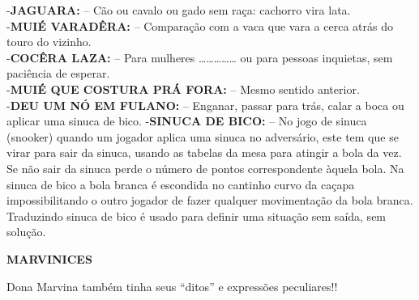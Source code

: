 \documentclass[12pt,brazil,]{book}
\begin{document}
-\textbf{JAGUARA:} -- Cão ou cavalo ou gado sem raça: cachorro vira
lata.\\
-\textbf{MUIÉ VARADÊRA:} -- Comparação com a vaca que vara a cerca atrás
do touro do vizinho.\\
-\textbf{COCÊRA LAZA:} -- Para mulheres
\ldots{}\ldots{}\ldots{}\ldots{}\ldots{} ou para pessoas inquietas, sem
paciência de esperar.\\
-\textbf{MUIÉ QUE COSTURA PRÁ FORA:} -- Mesmo sentido anterior.\\
-\textbf{DEU UM NÓ EM FULANO:} -- Enganar, passar para trás, calar a
boca ou aplicar uma sinuca de bico. -\textbf{SINUCA DE BICO:} -- No jogo
de sinuca (snooker) quando um jogador aplica uma sinuca no adversário,
este tem que se virar para sair da sinuca, usando as tabelas da mesa
para atingir a bola da vez. Se não sair da sinuca perde o número de
pontos correspondente àquela bola. Na sinuca de bico a bola branca é
escondida no cantinho curvo da caçapa impossibilitando o outro jogador
de fazer qualquer movimentação da bola branca. Traduzindo sinuca de bico
é usado para definir uma situação sem saída, sem solução.

\textbf{MARVINICES}

Dona Marvina também tinha seus ``ditos'' e expressões peculiares!!
\end{document}

